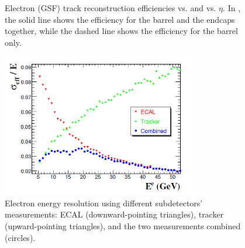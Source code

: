  \begin{figure}[htb]
  \begin{center}
  \end{center}
  \caption[\fixspacing Electron (GSF) track reconstruction efficiencies]
	  {\fixspacing Electron (GSF) track reconstruction efficiencies 
	     vs. \pt and 
	     vs. $\eta$. 
	    In , 
	    the solid line shows the efficiency 
	    for the barrel and the endcaps together, 
	    while the dashed line shows the efficiency 
	    for the barrel only.  
	  }
  \label{fig:elecTrackEff}
 \end{figure}

 \begin{figure}[htb]
  \begin{center}
    \includegraphics[width=240pt]{Figures/elec-energy-resolution-combined.png}
  \end{center}
  \caption[\fixspacing Electron energy resolution from ECAL, tracker, and combined]
	  {\fixspacing Electron energy resolution using different subdetectors' measurements: 
	    ECAL (downward-pointing triangles), tracker (upward-pointing triangles), 
	    and the two measurements combined (circles). 
	  }
  \label{fig:elecEnergyResolution}
 \end{figure}

